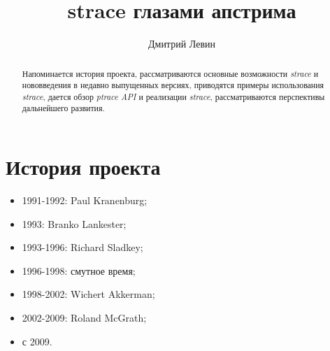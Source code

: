 
\author{Дмитрий Левин}
\title{strace глазами апстрима}

\maketitle

\begin{abstract}
Напоминается история проекта,
рассматриваются основные возможности \emph{strace}
и нововведения в недавно выпущенных версиях,
приводятся примеры использования \emph{strace},
дается обзор \emph{ptrace API} и реализации \emph{strace},
рассматриваются перспективы дальнейшего развития.
\end{abstract}

\section*{История проекта}
\begin{itemize}
\item 1991-1992: Paul Kranenburg;
\item 1993: Branko Lankester;
\item 1993-1996: Richard Sladkey;
\item 1996-1998: смутное время;
\item 1998-2002: Wichert Akkerman;
\item 2002-2009: Roland McGrath;
\item с 2009.
\end{itemize}

